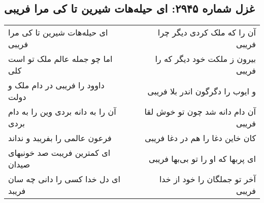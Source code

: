 \begin{center}
\section*{غزل شماره ۲۹۴۵: ای حیله‌هات شیرین تا کی مرا فریبی}
\label{sec:2945}
\begin{longtable}{l p{0.5cm} r}
ای حیله‌هات شیرین تا کی مرا فریبی
&&
آن را که ملک کردی دیگر چرا فریبی
\\
اما چو جمله عالم ملک تو است کلی
&&
بیرون ز ملکت خود دیگر که را فریبی
\\
داوود را فریبی در دام ملک و دولت
&&
و ایوب را دگرگون اندر بلا فریبی
\\
آن را به دانه بردی وین را به دام بردی
&&
آن دام دانه شد چون تو خوش لقا فریبی
\\
فرعون عالمی را بفریبد و نداند
&&
کان خاین دغا را هم در دغا فریبی
\\
ای کمترین فریبت صد خونبهای صیدان
&&
ای پربها که او را تو بی‌بها فریبی
\\
ای دل خدا کسی را دانی چه سان فریبد
&&
آخر تو جملگان را خود از خدا فریبی
\\
\end{longtable}
\end{center}
